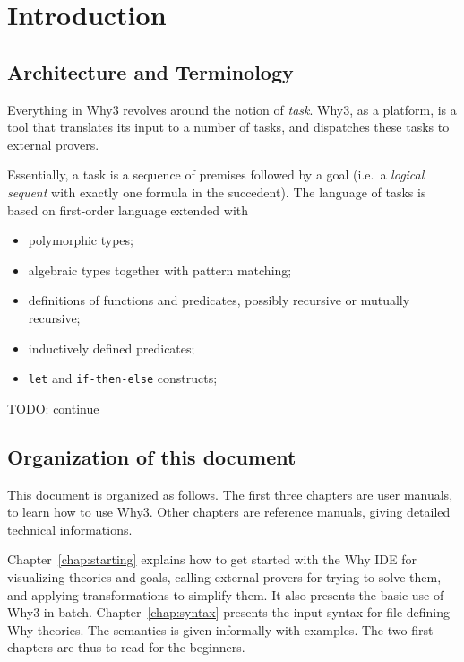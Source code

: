 
\chapter{Introduction}

\section{Architecture and Terminology}

Everything in Why3 revolves around the notion of
\emph{task}.  Why3, as a platform, is a tool that
translates its input to a number of tasks, and dispatches these tasks
to external provers. 

Essentially, a task is a sequence of premises followed by a goal
(i.e.~a \emph{logical sequent} with exactly one formula in the
succedent). The language of tasks is based on first-order language
extended with 
\begin{itemize}
\item polymorphic types;
\item algebraic types together with pattern matching;
\item definitions of functions and predicates, possibly recursive or
  mutually recursive;
\item inductively defined predicates;
\item \texttt{let} and \texttt{if-then-else} constructs;
\end{itemize}

TODO: continue

\section{Organization of this document}

This document is organized as follows. The first three chapters are
user manuals, to learn how to use Why3. Other chapters are reference
manuals, giving detailed technical informations.

Chapter~\ref{chap:starting} explains how to get started with the Why
IDE for visualizing theories and goals, calling external provers for
trying to solve them, and applying transformations to simplify
them. It also presents the basic use of Why3 in
batch. Chapter~\ref{chap:syntax} presents the input syntax for file
defining Why theories. The semantics is given informally with
examples.  The two first chapters are thus to read for the beginners.

